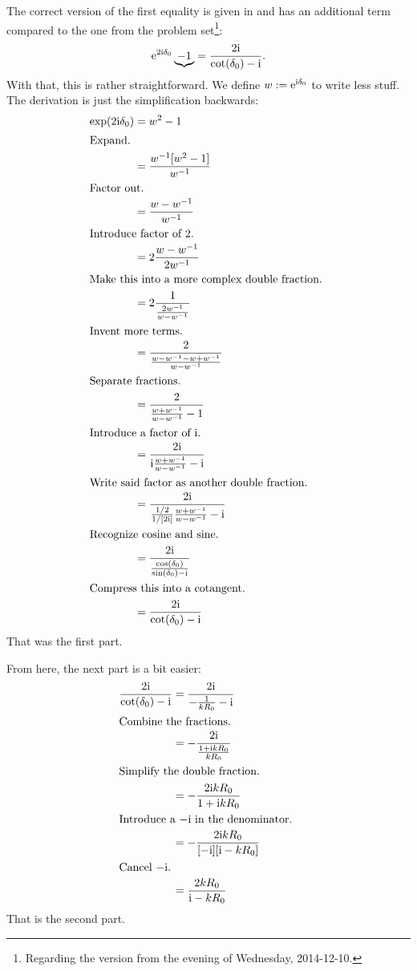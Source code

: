 \documentclass[11pt, english, fleqn, DIV=15, headinclude, BCOR=1.5cm]{scrartcl}
\begin{document}
The correct version of the first equality is given in
\parencite[(18.95)]{Schwabl/Quantenmechanik} and has an additional term
compared to the one from the problem set\footnote{Regarding the version from
the evening of Wednesday, 2014-12-10.}:
\[
    \mathrm e^{2 \mathrm i \delta_0} \underbrace{-1}
    = \frac{2 \mathrm i}{\cot(\delta_0) - \mathrm i}.
\]
With that, this is rather straightforward. We define $w := \mathrm e^{\mathrm i
\delta_0}$ to write less stuff. The derivation is just the simplification
backwards:
\begin{align*}
    \exp(2 \iup \delta_0)
    &= w^2 - 1 \\
    \intertext{%
        Expand.
    }
    &= \frac{w^{-1} [w^2 -1]}{w^{-1}} \\
    \intertext{%
        Factor out.
    }
    &= \frac{w - w^{-1}}{w^{-1}} \\
    \intertext{%
        Introduce factor of 2.
    }
    &= 2 \frac{w - w^{-1}}{2 w^{-1}} \\
    \intertext{%
        Make this into a more complex double fraction.
    }
    &= 2 \frac{1}{\frac{2 w^{-1}}{w - w^{-1}}} \\
    \intertext{%
        Invent more terms.
    }
    &= \frac{2}{\frac{w - w^{-1} - w + w^{-1}}{w - w^{-1}}} \\
    \intertext{%
        Separate fractions.
    }
    &= \frac{2}{\frac{w + w^{-1}}{w - w^{-1}} - 1} \\
    \intertext{%
        Introduce a factor of $\iup$.
    }
    &= \frac{2\iup}{\iup\frac{w + w^{-1}}{w - w^{-1}} - \iup} \\
    \intertext{%
        Write said factor as another double fraction.
    }
    &= \frac{2\iup}{\frac{1/2}{1/[2\iup]}\frac{w + w^{-1}}{w - w^{-1}} - \iup} \\
    \intertext{%
        Recognize cosine and sine.
    }
    &= \frac{2\iup}{\frac{\cos(\delta_0)}{\sin(\delta_0) - \iup}} \\
    \intertext{%
        Compress this into a cotangent.
    }
    &= \frac{2\iup}{\cot(\delta_0) - \iup}
\end{align*}
That was the first part.

From here, the next part is a bit easier:
\begin{align*}
    \frac{2\iup}{\cot(\delta_0) - \iup}
    &= \frac{2\iup}{- \frac{1}{k R_0} - \iup} \\
    \intertext{%
        Combine the fractions.
    }
    &= - \frac{2\iup}{\frac{1 + \iup k R_0}{k R_0}} \\
    \intertext{%
        Simplify the double fraction.
    }
    &= - \frac{2\iup k R_0}{1 + \iup k R_0} \\
    \intertext{%
        Introduce a $-\iup$ in the denominator.
    }
    &= - \frac{2\iup k R_0}{[-\iup][\iup - k R_0]} \\
    \intertext{%
        Cancel $-\iup$.
    }
    &= \frac{2 k R_0}{\iup - k R_0}
\end{align*}
That is the second part.
\end{document}
